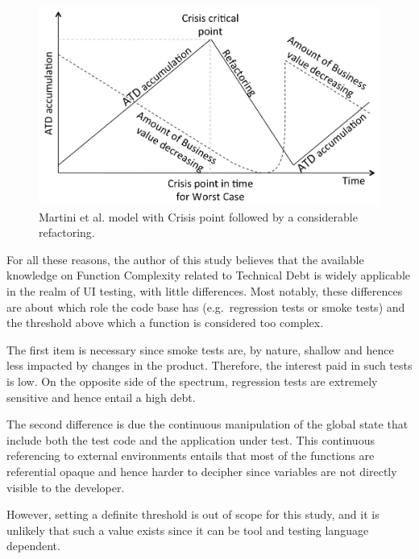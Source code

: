     \begin{figure}[!htbp]
    	\centering
    	\includegraphics[width=\textwidth]{figure/discussion/martini-model.png}
    	\caption{Martini et al. \cite{martini2014architecture} model with Crisis point followed by a considerable refactoring.}
    	\label{fig:antonio-model}
		\end{figure}

    For all these reasons, the author of this study believes that the available knowledge on Function Complexity related to Technical Debt is widely applicable in the realm of UI testing, with little differences. Most notably, these differences are about which role the code base has (e.g.\ regression tests or smoke tests) and the threshold above which a function is considered too complex.


     \label{sec:disc-rq3-function-complexity}
    The first item is necessary since smoke tests are, by nature, shallow and hence less impacted by changes in the product. Therefore, the interest paid in such tests is low. On the opposite side of the spectrum, regression tests are extremely sensitive and hence entail a high debt.

    The second difference is due the continuous manipulation of the global state that include both the test code and the application under test. This continuous referencing to external environments entails that most of the functions are referential opaque \cite{referential_transparency} and hence harder to decipher since variables are not directly visible to the developer.

    However, setting a definite threshold is out of scope for this study, and it is unlikely that such a value exists since it can be tool and testing language dependent.

